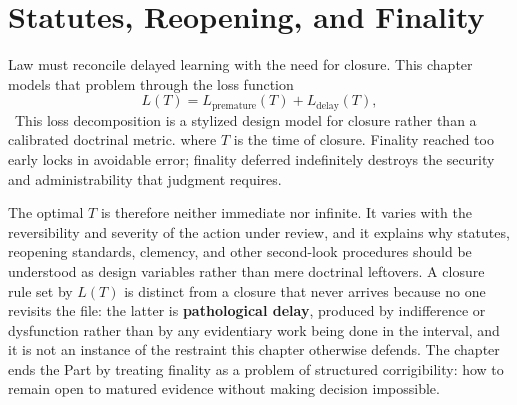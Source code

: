 
\chapter{Statutes, Reopening, and Finality}
\label{ch:ch022}

Law must reconcile delayed learning with the need for closure. This chapter models that problem through the loss function
\[
L(T)
=
L_{\mathrm{premature}}(T)
+
L_{\mathrm{delay}}(T),
\]
\ToyModel\ This loss decomposition is a stylized design model for closure rather than a calibrated doctrinal metric.
where \(T\) is the time of closure. Finality reached too early locks in avoidable error; finality deferred indefinitely destroys the security and administrability that judgment requires.

The optimal \(T\) is therefore neither immediate nor infinite. It varies with the reversibility and severity of the action under review, and it explains why statutes, reopening standards, clemency, and other second-look procedures should be understood as design variables rather than mere doctrinal leftovers. A closure rule set by \(L(T)\) is distinct from a closure that never arrives because no one revisits the file: the latter is \textbf{pathological delay}, produced by indifference or dysfunction rather than by any evidentiary work being done in the interval, and it is not an instance of the restraint this chapter otherwise defends. The chapter ends the Part by treating finality as a problem of structured corrigibility: how to remain open to matured evidence without making decision impossible.
